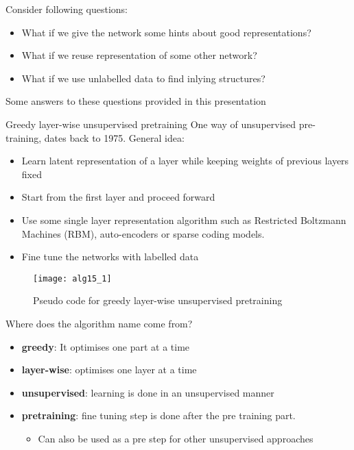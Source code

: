 \begin{frame}
Consider following questions:
\begin{itemize}
\item What if we give the network some hints about good representations?
\item What if we reuse representation of some other network?
\item What if we use unlabelled data to find inlying structures?
\end{itemize}
Some answers to these questions provided in this presentation
\end{frame}

\begin{frame}{Greedy layer-wise unsupervised pretraining}
One way of unsupervised pre-training, dates back to 1975. General idea:
\begin{itemize}
\item Learn latent representation of a layer while keeping weights of previous layers fixed
\item Start from the first layer and proceed forward
\item Use some single layer representation algorithm such as Restricted Boltzmann Machines (RBM), auto-encoders or sparse coding models.
\item Fine tune the networks with labelled data
\end{itemize}
\end{frame}

\begin{frame}
\begin{figure}[t]
\centering
\texttt{[image: alg15\_1]} %
\caption{Pseudo code for greedy layer-wise unsupervised pretraining}
\end{figure}
\end{frame}

\begin{frame}
Where does the algorithm name come from?
\begin{itemize}
\item{\bf greedy}: It optimises one part at a time
\item{\bf layer-wise}: optimises one layer at a time
\item{\bf unsupervised}: learning is done in an unsupervised manner
\item{\bf pretraining}: fine tuning step is done after the pre training part. 
\begin{itemize}
\item Can also be used as a pre step for other unsupervised approaches 
\end{itemize}
\end{itemize}
\end{frame}

